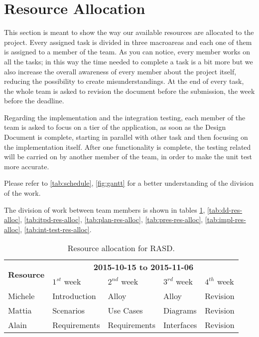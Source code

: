 \section{Resource Allocation}

This section is meant to show the way our available resources are allocated to the project. Every assigned task is divided in three macroareas and each one of them is assigned to a member of the team.
As you can notice, every member works on all the tasks; in this way the time needed to complete a task is a bit more but we also increase the overall awareness of every member about the project itself, reducing the possibility to create misunderstandings.
At the end of every task, the whole team is asked to revision the document before the submission, the week before the deadline.

Regarding the implementation and the integration testing, each member of the team is asked to focus on a tier of the application, as soon as the Design Document is complete, starting in parallel with other task and then focusing on the implementation itself.
After one functionality is complete, the testing related will be carried on by another member of the team, in order to make the unit test more accurate.

Please refer to \autoref{tab:schedule}, \autoref{fig:gantt} for a better understanding of the division of the work.

The division of work between team members is shown in tables \ref{tab:rasd-res-alloc}, \ref{tab:dd-res-alloc}, \ref{tab:itpd-res-alloc}, \ref{tab:plan-res-alloc}, \ref{tab:pres-res-alloc}, \ref{tab:impl-res-alloc}, \ref{tab:int-test-res-alloc}.

\begin{table}
    \centering
    \begin{small}
    \begin{tabular}{| l | l | l | l | l |}
        \hline
        \multirow{2}{*}{\textbf{Resource}} & \multicolumn{4}{c|}{\textbf{2015-10-15 to 2015-11-06}} \\
        \cline{2-5}
        & $1^{st}$ week & $2^{nd}$ week & $3^{rd} $ week & $4^{th}$ week\\
        \hline
        Michele     & Introduction  & Alloy          & Alloy       & Revision    \\
        Mattia      & Scenarios     & Use Cases      & Diagrams    & Revision    \\
        Alain       & Requirements  & Requirements   & Interfaces  & Revision    \\
        \hline
    \end{tabular}
    \end{small}
    \caption{Resource allocation for RASD.}
    \label{tab:rasd-res-alloc}
\end{table}


